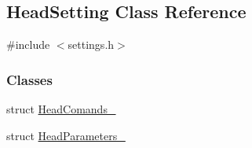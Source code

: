 \hypertarget{classHeadSetting}{}\subsection{Head\+Setting Class Reference}
\label{classHeadSetting}


{\ttfamily \#include $<$settings.\+h$>$}

\subsubsection*{Classes}
\begin{DoxyCompactItemize}
\item 
struct \mbox{\hyperlink{structHeadSetting_1_1HeadComands__}{Head\+Comands\+\_\+}}
\item 
struct \mbox{\hyperlink{structHeadSetting_1_1HeadParameters__}{Head\+Parameters\+\_\+}}
\end{DoxyCompactItemize}
